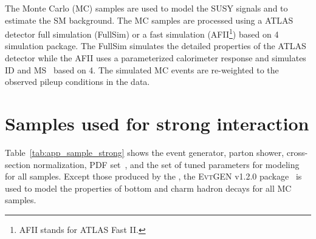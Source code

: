 The Monte Carlo (MC) samples are used to model the SUSY signals and to estimate the SM background.
The MC samples are processed using a ATLAS detector full simulation (FullSim) or a fast simulation (AFII\footnote{AFII stands for ATLAS Fast II.}) based on {\GEANT}4~\cite{Agostinelli:2002hh} simulation package.
The FullSim simulates the detailed properties of the ATLAS detector while the AFII uses a parameterized calorimeter response and simulates ID and MS~\cite{ATLAS:2010bfa} based on {\GEANT}4.
The simulated MC events are re-weighted to the observed pileup conditions in the data.


\section{Samples used for strong interaction}
\label{sec:app_samples_strong}






Table~\ref{tab:app_sample_strong} shows the event generator, parton shower, cross-section normalization, PDF set~\cite{Martin:2009iq}, and the set of tuned parameters for modeling for all samples.
Except those produced by the {\SHERPA}, the \textsc{EvtGEN}\xspace v1.2.0 package~\cite{Lange:2001uf} is used to model the properties of bottom and charm hadron decays for all MC samples.

